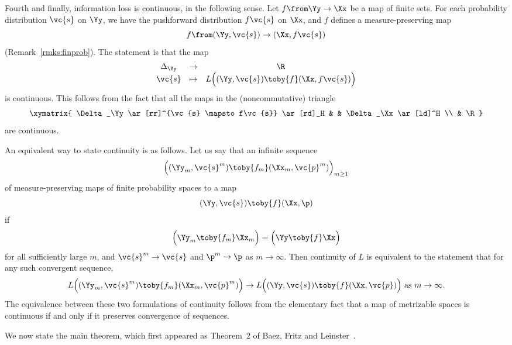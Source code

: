 Fourth and finally, information loss is continuous,%
%
%
% 
in the following sense.  Let $f \from \Yy \to \Xx$ be a map of finite sets.
For each probability distribution $\vc{s}$ on $\Yy$, we have the
pushforward distribution $f \vc{s}$ on $\Xx$, and $f$ defines a
measure-preserving map
\[
f \from (\Yy, \vc{s}) \to (\Xx, f \vc{s})
\]
(Remark~\ref{rmks:finprob}).  The statement is
that the map 
\[
\begin{array}{ccc}
\Delta_\Yy      &\to            &\R     \\
\vc{s}          &\mapsto        &
L \Bigl( (\Yy, \vc{s}) \toby{f} (\Xx, f\vc{s}) \Bigr)
\end{array}
\]
is continuous.  This follows from the fact that all the maps in the
(noncommutative) triangle
\[
\xymatrix{
\Delta_\Yy \ar[rr]^{\vc{s} \mapsto f\vc{s}} \ar[rd]_H        &
&
\Delta_\Xx \ar[ld]^H                      \\
&
\R
} 
\]
are continuous.

An equivalent way to state continuity is as follows.  Let us say that an
infinite sequence
\[
\Bigl(
(\Yy_m, \vc{s}^m) \toby{f_m} (\Xx_m, \vc{p}^m)
\Bigr)_{m \geq 1}
\]
of measure-preserving maps of finite probability spaces
 to a map
\[
(\Yy, \vc{s}) \toby{f} (\Xx, \p)
\]
if 
\[
\Bigl( \Yy_m \toby{f_m} \Xx_m \Bigr) = \Bigl( \Yy \toby{f} \Xx \Bigr)
\]
for all sufficiently large $m$, and $\vc{s}^m \to \vc{s}$ and $\p^m \to \p$
as $m \to \infty$.  Then continuity of $L$ is equivalent to the statement
that for any such convergent sequence,
\[
L
\Bigl(
(\Yy_m, \vc{s}^m) \toby{f_m} (\Xx_m, \vc{p}^m)
\Bigr)
\to
L
\Bigl(
(\Yy, \vc{s}) \toby{f} (\Xx, \vc{p})
\Bigr)
\text{ as } m \to \infty.
\]
The equivalence between these two formulations of continuity follows from
the elementary fact that a map of metrizable spaces is continuous if and
only if it preserves convergence of sequences.

We now state the main theorem, which first appeared as Theorem~2 of
Baez, Fritz and Leinster~\cite{CETIL}.

